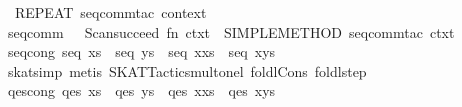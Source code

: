 \begin{isabellebody}
\ \ REPEAT{}\ {}seq{}comm{}{}tac\ context\ {}{}{}\isanewline
{}\isanewline
\isanewline
{}\isamarkupfalse%
\ seq{}comm\ {}\ {}\ Scan{}succeed\ {}fn\ ctxt\ {}{}\ SIMPLE{}METHOD{}\ {}seq{}comm{}tac\ ctxt{}{}\ {}%
\endisatagML
{\isafoldML}%
%
\isadelimML
\isanewline
%
\endisadelimML
\isanewline
{}\isamarkupfalse%
\ seq{}cong{}\ {}seq\ xs\ {}\ seq\ ys\ {}\ seq\ {}x{}xs{}\ {}\ seq\ {}x{}ys{}{}\isanewline
%
\isadelimproof
\ \ %
\endisadelimproof
%
\isatagproof
{}\isamarkupfalse%
\ {}skat{}simp{}\ metis\ SKAT{}Tactics{}mult{}onel\ foldl{}Cons\ foldl{}step{}%
\endisatagproof
{\isafoldproof}%
%
\isadelimproof
\isanewline
%
\endisadelimproof
\isanewline
{}\isamarkupfalse%
\ qes{}cong{}\ {}qes\ xs\ {}\ qes\ ys\ {}\ qes\ {}x{}xs{}\ {}\ qes\ {}x{}ys{}{}\isanewline

\end{isabellebody}
